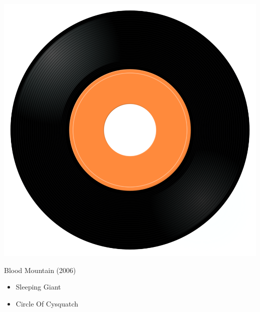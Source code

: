 \begin{minipage}[t]{0.25\textwidth}
\captionsetup{type=figure}
\includegraphics[width=\textwidth]{Images/cover.png}
\caption*{Blood Mountain (2006)}
\end{minipage}
\begin{minipage}[t]{0.25\textwidth}\vspace{0pt}
\begin{itemize}[nosep,leftmargin=1em,labelwidth=*,align=left]
	\setlength{\itemsep}{0pt}
	\item Sleeping Giant
	\item Circle Of Cysquatch
\end{itemize}
\end{minipage}
